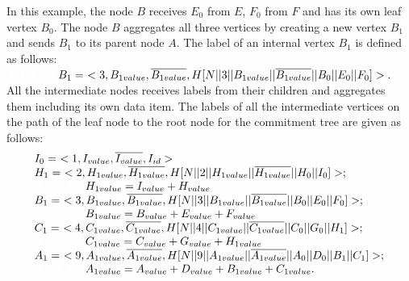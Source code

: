 		In this example, the node $B$ receives $E_{0}$ from $E$, $F_{0}$ from $F$ and has its own leaf vertex $B_{0}$.
		The node $B$ aggregates all three vertices by creating a new vertex $B_{1}$ and sends $B_{1}$ to its parent node $A$.
		The label of an internal vertex $B_{1}$ is defined as follows:\\
			$\textcolor{white}{XXXXX}B_{1} =\ <3, B_{1value}, \overline{B_{1value}}, H[N || 3 || B_{1value} || \overline{B_{1value}} ||B_{0}||E_{0}||F_{0}]>.$\\
		All the intermediate nodes receives labels from their children and aggregates them including its own data item. 
		The labels of all the intermediate vertices on the path of the leaf node to the root node for the commitment tree are given as follows:
		\begin{equation*}
			\begin{array}{l}
				I_{0} =\ <1, I_{value}, \overline{I_{value}}, I_{id}>\\
				H_{1} =\ <2, H_{1value}, \overline{H_{1value}}, H [ N || 2 || H_{1value} || \overline{H_{1value}} || H_{0} || I_{0} ] > ;\\
				\textcolor{white}{XXXXX} H_{1value} = I_{value} + H_{value}\\
				B_{1} =\ <3, B_{1value}, \overline{B_{1value}}, H [ N || 3 || B_{1value} || \overline{B_{1value}} || B_{0} || E_{0} || F_{0} ] > ; \\ 
				\textcolor{white}{XXXXX} B_{1value} = B_{value} + E_{value} + F_{value} \\
				C_{1} =\ <4, C_{1value}, \overline{C_{1value}}, H [ N || 4 || C_{1value} || \overline{C_{1value}} || C_{0} || G_{0} || H_{1} ] >; \\
				\textcolor{white}{XXXXX} C_{1value} = C_{value} + G_{value} + H_{1value} \\
				A_{1} =\ <9, A_{1value}, \overline{A_{1value}}, H [ N || 9 || A_{1value} || \overline{A_{1value}} || A_{0} || D_{0} || B_{1} || C_{1} ] >;\\
				\textcolor{white}{XXXXX} A_{1value} = A_{value} + D_{value} + B_{1value} + C_{1value}.
			\end{array}
		\end{equation*}
